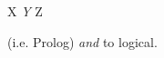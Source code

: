 \documentclass{memoir}
\begin{document}
X \emph{Y} Z

(i.e. Prolog) {\em
and} to logical.
\end{document}
